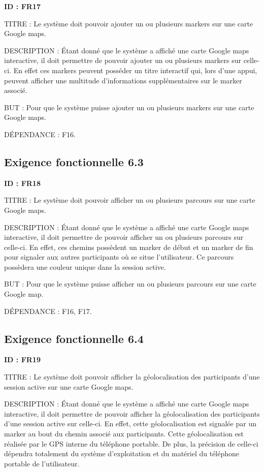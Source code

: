 \documentclass[titlepage, 12pt]{report}
\begin{document}
\textbf{ID : FR17}

TITRE : Le système doit pouvoir ajouter un ou plusieurs markers sur une carte Google maps.

DESCRIPTION : Étant donné que le système a affiché une carte Google maps interactive, il doit permettre de pouvoir ajouter un ou plusieurs markers sur celle-ci. En effet ces markers peuvent posséder un titre interactif qui, lors d'une appui, peuvent afficher une multitude d'informations supplémentaires sur le marker associé.

BUT : Pour que le système puisse ajouter un ou plusieurs markers sur une carte Google maps.

DÉPENDANCE : F16.

\subsection{Exigence fonctionnelle 6.3}

\textbf{ID : FR18}

TITRE : Le système doit pouvoir afficher un ou plusieurs parcours sur une carte Google maps.

DESCRIPTION : Étant donné que le système a affiché une carte Google maps interactive, il doit permettre de pouvoir afficher un ou plusieurs parcours sur celle-ci. En effet, ces chemins possèdent un marker de début et un marker de fin pour signaler aux autres participants où se situe l'utilisateur. Ce parcours possèdera une couleur unique dans la session active.

BUT : Pour que le système puisse afficher un ou plusieurs parcours sur une carte Google map.

DÉPENDANCE : F16, F17.

\subsection{Exigence fonctionnelle 6.4}

\textbf{ID : FR19}

TITRE : Le système doit pouvoir afficher la géolocalisation des participants d'une session active sur une carte Google maps.

DESCRIPTION : Étant donné que le système a affiché une carte Google maps interactive, il doit permettre de pouvoir afficher la géolocalisation des participants d'une session active sur celle-ci. En effet, cette géolocalisation est signalée par un marker au bout du chemin associé aux participants. Cette géolocalisation est réalisée par le GPS interne du téléphone portable. De plus, la précision de celle-ci dépendra totalement du système d'exploitation et du matériel du téléphone portable de l'utilisateur. 
\end{document}
